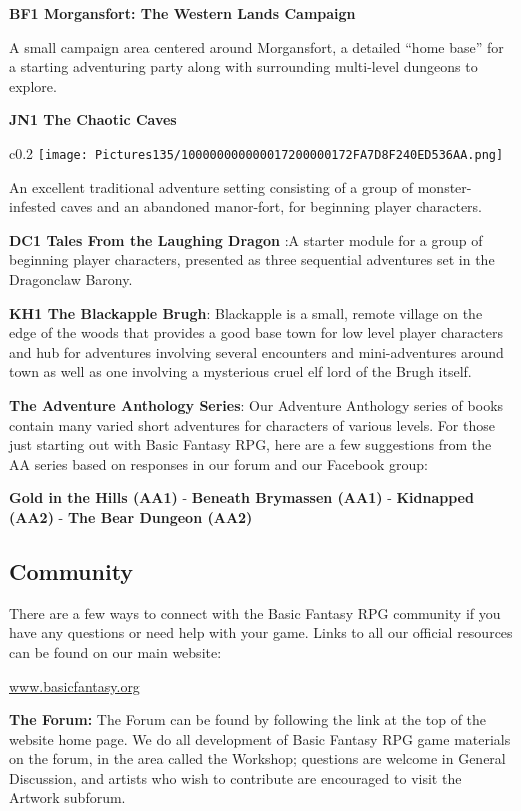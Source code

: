 \documentclass[a4paper,twoside,openany,10pt]{book}
\begin{document}
\textbf{BF1 Morgansfort: The Western Lands Campaign}

A small campaign area centered around Morgansfort, a detailed ``home base'' for a starting adventuring party along with surrounding multi-level dungeons to explore.

\textbf{JN1 The Chaotic Caves}

\begin{wrapfigure}{c}{0.2\textwidth}
	 \texttt{[image: Pictures135/100000000000017200000172FA7D8F240ED536AA.png]}  
\end{wrapfigure}


An excellent traditional adventure setting consisting of a group of monster-infested caves and an abandoned manor-fort, for beginning player characters.

\textbf{DC1 Tales From the Laughing Dragon} :A starter module for a group of beginning player characters, presented as three sequential adventures set in the Dragonclaw Barony.

\textbf{KH1 The Blackapple Brugh}: Blackapple is a small, remote village on the edge of the woods that provides a good base town for low level player characters and hub for adventures involving several encounters and mini-adventures around town as well as one involving a mysterious cruel elf lord of the Brugh itself.

\textbf{The Adventure Anthology Series}: Our Adventure Anthology series of books contain many varied short adventures for characters of various levels. For those just starting out with Basic Fantasy RPG, here are a few suggestions from the AA series based on responses in our forum and our Facebook group:

\textbf{Gold in the Hills (AA1)} - \textbf{Beneath Brymassen (AA1)} -  \textbf{Kidnapped (AA2)} - \textbf{The Bear Dungeon (AA2)}


\subsection{Community}\label{community}

There are a few ways to connect with the Basic Fantasy RPG community if you have any questions or need help with your game. Links to all our official resources can be found on our main website:

\href{www.basicfantasy.org}{www.basicfantasy.org}

\textbf{The Forum:} The Forum can be found by following the link at the top of the website home page. We do all development of Basic Fantasy RPG game materials on the forum, in the area called the Workshop; questions are welcome in General Discussion, and artists who wish to contribute are encouraged to visit the Artwork subforum.
\end{document}
